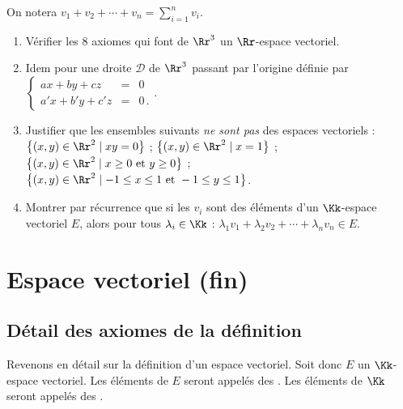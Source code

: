\documentclass[class=report,crop=false]{standalone}
\begin{document}
On notera $v_1+v_2+\cdots+v_n={\displaystyle \sum_{i=1}^nv_{i}}$.



\begin{miniexercices}
\sauteligne
\begin{enumerate}
  \item Vérifier les $8$ axiomes qui font de $\Rr^3$ un $\Rr$-espace vectoriel.

  \item Idem pour une droite $\mathcal{D}$ de $\Rr^3$ passant par l'origine définie par
  $\left\{\begin{array}{rcl}ax+by+cz & = & 0 \\a'x+b'y+c'z & = & 0 \,.  \end{array}\right.$.

  \item Justifier que les ensembles suivants \emph{ne sont pas} des espaces vectoriels :
  $\big\{ (x,y) \in \Rr^2 \mid xy=0\big\}$ ;
  $\big\{ (x,y) \in \Rr^2 \mid x=1\big\}$ ;
  $\big\{ (x,y) \in \Rr^2 \mid x\ge0 \text{ et } y\ge0 \big\}$ ;
  $\big\{ (x,y) \in \Rr^2 \mid -1 \le x \le 1 \text{ et } -1 \le y \le 1 \big\}$.

  \item Montrer par récurrence que si les $v_i$ sont des éléments d'un $\Kk$-espace vectoriel
  $E$, alors pour tous $\lambda_i\in \Kk$ : $\lambda_1 v_1+\lambda_2v_2+\cdots + \lambda_n v_n \in E$.
\end{enumerate}
\end{miniexercices}

\section{Espace vectoriel (fin)}

\subsection{Détail des axiomes de la définition}


Revenons en détail sur la définition d'un espace vectoriel.
Soit donc $E$ un $\Kk$-espace vectoriel.
Les éléments de $E$ seront appelés des .
Les éléments de $\Kk$ seront appelés des .
\end{document}
